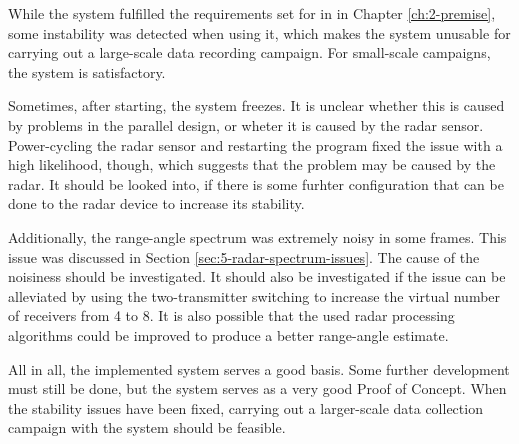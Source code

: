 While the system fulfilled the requirements set for in in Chapter \ref{ch:2-premise},
some instability was detected when using it,
which makes the system unusable for carrying out a large-scale data recording campaign.
For small-scale campaigns, the system is satisfactory.

Sometimes, after starting, the system freezes.
It is unclear whether this is caused by problems in the parallel design,
or wheter it is caused by the radar sensor.
Power-cycling the radar sensor and restarting the program fixed the issue with a high likelihood, though,
which suggests that the problem may be caused by the radar.
It should be looked into, if there is some furhter configuration that can be done to the radar device to increase its stability.

Additionally, the range-angle spectrum was extremely noisy in some frames.
This issue was discussed in Section \ref{sec:5-radar-spectrum-issues}.
The cause of the noisiness should be investigated.
It should also be investigated if the issue can be alleviated by using the two-transmitter switching to increase the virtual number
of receivers from 4 to 8.
It is also possible that the used radar processing algorithms could be improved to produce a better range-angle estimate.

All in all, the implemented system serves a good basis.
Some further development must still be done,
but the system serves as a very good Proof of Concept.
When the stability issues have been fixed,
carrying out a larger-scale data collection campaign with the system should be feasible.